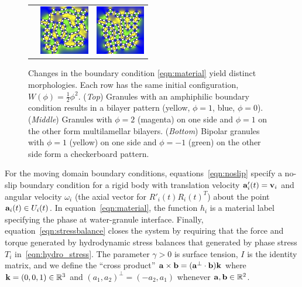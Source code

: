 \begin{figure}
\begin{center}
\begin{tabular}{m{0.9in}m{0.9in}m{0.9in}}
      &\includegraphics[width=0.85in]{figures/SpecificAim1/N100A2.jpg}
      &\includegraphics[width=0.85in]{figures/SpecificAim1/N100A3.jpg} 
  \end{tabular}
  \end{center}
  \vspace{-20pt}
  \caption{\footnotesize \label{fig:self-assembly2} Changes in the
  boundary condition \eqref{eqn:material} yield distinct morphologies.
  Each row has the same initial configuration, $W(\phi) =
  \tfrac{1}{2}\phi^2$. (\emph{Top}) Granules with an amphiphilic
  boundary condition results in a bilayer pattern (yellow, $\phi = 1$,
  blue, $\phi = 0$). (\emph{Middle}) Granules with $\phi = 2$ (magenta)
  on one side and $\phi = 1$ on the other form multilamellar bilayers.
  (\emph{Bottom}) Bipolar granules with $\phi = 1$ (yellow) on one side
  and $\phi=-1$ (green) on the other side form a checkerboard pattern.}
\end{figure}

For the moving domain boundary conditions, equations~\eqref{eqn:noslip}
specify a no-slip boundary condition for a rigid body with translation
velocity $\aa'_i(t) = \vv_i$ and angular velocity $\omega_i$ (the axial
vector for $R'_i(t)R_i(t)^T$) about the point $\aa_i(t) \in U_i(t)$. In
equation~\eqref{eqn:material}, the function $h_i$ is a material label
specifying the phase at water-granule interface. Finally,
equation~\eqref{eqn:stressbalance} closes the system by requiring that
the force and torque generated by hydrodynamic stress balances that
generated by phase stress $T_i$ in~\eqref{eqn:hydro_stress}. The
parameter $\gamma > 0$ is surface tension, $I$ is the identity matrix,
and we define the ``cross product'' $\aa \times \bb = (\aa^{\perp} \cdot
\bb) \kk$ where $\kk = (0,0,1) \in \RR^3$ and $(a_1,a_2)^{\perp} =
(-a_2,a_1)$ whenever $\aa, \bb \in \mathbb{R}^2$.

